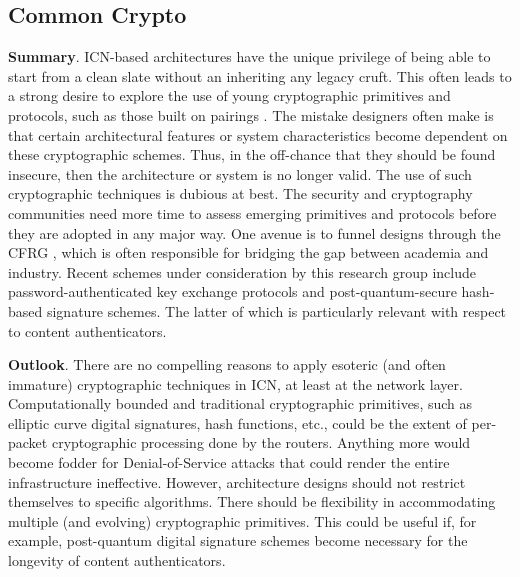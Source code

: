 \subsection{Common Crypto}
{\bf Summary}. ICN-based architectures have the unique privilege of being able to start from
a clean slate without an inheriting any legacy cruft. This often leads to a strong
desire to explore the use of young cryptographic primitives and protocols, such as
those built on pairings \cite{wood2014flexible}. The mistake designers often make is
that certain architectural features or system characteristics become dependent on
these cryptographic schemes. Thus, in the off-chance that they should be found insecure,
then the architecture or system is no longer valid. The use of such cryptographic
techniques is dubious at best. The security and cryptography communities need
more time to assess emerging primitives and protocols before they are adopted in
any major way. One avenue is to funnel designs through the CFRG \cite{cfrg}, which
is often responsible for bridging the gap between academia and industry. Recent
schemes under consideration by this research group include password-authenticated key
exchange protocols and post-quantum-secure hash-based signature schemes. The latter
of which is particularly relevant with respect to content authenticators.

{\bf Outlook}. There are no compelling reasons to apply esoteric (and often immature)
cryptographic techniques in ICN, at least at the network layer. Computationally bounded
and traditional cryptographic primitives, such as elliptic curve digital signatures, hash functions, etc.,
could be the extent of per-packet cryptographic processing done by the routers.
Anything more would become fodder for Denial-of-Service attacks that could render
the entire infrastructure ineffective. However, architecture designs should not
restrict themselves to specific algorithms. There should be flexibility in accommodating
multiple (and evolving) cryptographic primitives. This could be useful if, for example,
post-quantum digital signature schemes become necessary for the longevity of content authenticators.

